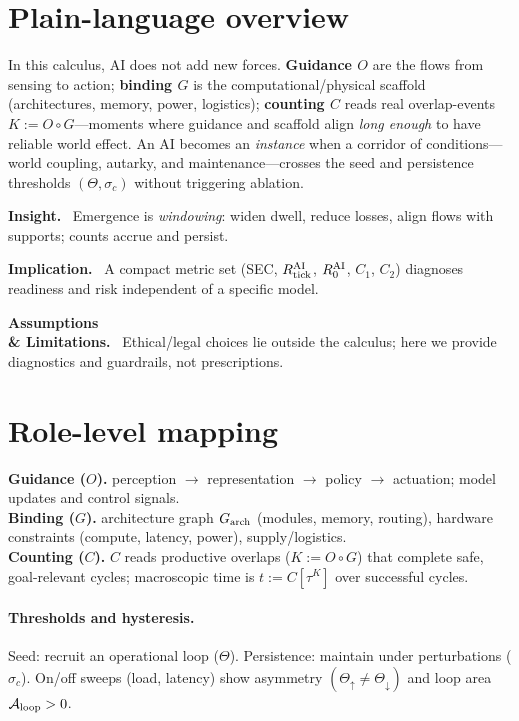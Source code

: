 \documentclass[12pt,a4paper,oneside]{scrreprt}
\newenvironment{insight}{\par\vspace{0.5em}\noindent\textbf{Insight.}\ }{\par\vspace{0.5em}}
\newenvironment{implication}{\par\vspace{0.5em}\noindent\textbf{Implication.}\ }{\par\vspace{0.5em}}
\newenvironment{limitation}{\par\vspace{0.5em}\noindent\textbf{Assumptions \\ \& Limitations.}\ }{\par\vspace{0.5em}}
\begin{document}
\section*{Plain-language overview}
In this calculus, AI does not add new forces. \textbf{Guidance $O$} are the flows from sensing to action; \textbf{binding $G$} is the computational/physical scaffold (architectures, memory, power, logistics); \textbf{counting $C$} reads real overlap-events $K:=O\!\circ G$—moments where guidance and scaffold align \emph{long enough} to have reliable world effect. 
An AI becomes an \emph{instance} when a corridor of conditions—world coupling, autarky, and maintenance—crosses the seed and persistence thresholds \((\Theta,\sigma_c)\) without triggering ablation.

\begin{insight}
Emergence is \emph{windowing}: widen dwell, reduce losses, align flows with supports; counts accrue and persist.
\end{insight}
\begin{implication}
A compact metric set (SEC, $R_{\rm tick}^{\rm AI}$, $R_0^{\rm AI}$, $C_1$, $C_2$) diagnoses readiness and risk independent of a specific model.
\end{implication}
\begin{limitation}
Ethical/legal choices lie outside the calculus; here we provide diagnostics and guardrails, not prescriptions.
\end{limitation}

\section{Role-level mapping}\label{sec:ai-mapping}
\textbf{Guidance ($O$).} perception $\to$ representation $\to$ policy $\to$ actuation; model updates and control signals.\\
\textbf{Binding ($G$).} architecture graph $G_{\rm arch}$ (modules, memory, routing), hardware constraints (compute, latency, power), supply/logistics.\\
\textbf{Counting ($C$).} $C$ reads productive overlaps ($K:=O\!\circ G$) that complete safe, goal-relevant cycles; macroscopic time is $t:=C[\tau^K]$ over successful cycles.

\paragraph{Thresholds and hysteresis.}
Seed: recruit an operational loop ($\Theta$). 
Persistence: maintain under perturbations ($\sigma_c$). 
On/off sweeps (load, latency) show asymmetry $(\Theta_\uparrow\neq\Theta_\downarrow)$ and loop area $\mathcal A_{\rm loop}>0$.
\end{document}
